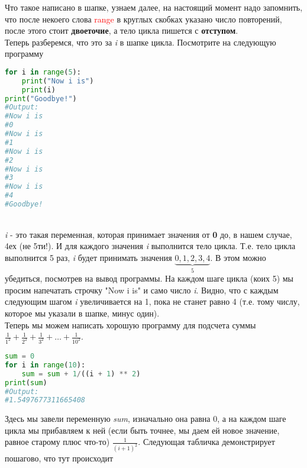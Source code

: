 \documentclass[12pt]{article} %
\begin{document}
Что такое написано в шапке, узнаем далее, на настоящий момент надо запомнить, что после некоего слова \textcolor{red}{range} в круглых скобках указано число повторений, после этого стоит \textbf{двоеточие}, а тело цикла пишется с \textbf{отступом}.\\
Теперь разберемся, что это за \textit{i} в шапке цикла. Посмотрите на следующую программу
\begin{lstlisting}[language=Python]
for i in range(5): 
	print("Now i is") 
	print(i)
print("Goodbye!") 
#Output:
#Now i is
#0
#Now i is
#1
#Now i is
#2
#Now i is
#3
#Now i is
#4
#Goodbye!
\end{lstlisting}
\\
\textit{i} - это такая переменная, которая принимает значения от \textbf{0} до, в нашем случае, 4ех (не 5ти!). И для каждого значения \textit{i} выполнится тело цикла. Т.е. тело цикла выполнится 5 раз, \textit{i} будет принимать значения $\underbrace{0, 1, 2, 3, 4}_{5}$. В этом можно убедиться, посмотрев на вывод программы. На каждом шаге цикла (коих 5) мы просим напечатать строчку "Now i is" и само число \textit{i}. Видно, что с каждым следующим шагом \textit{i} увеличивается на 1, пока не станет равно 4 (т.е. тому числу, которое мы указали в шапке, минус один). \\
Теперь мы можем написать хорошую программу для подсчета суммы $\frac{1}{1^2} + \frac{1}{2^2} + \frac{1}{3^2} + \ldots + \frac{1}{10^2}$. 
\begin{lstlisting}[language=Python]
sum = 0
for i in range(10):
	sum = sum + 1/((i + 1) ** 2)
print(sum)
#Output:
#1.5497677311665408
\end{lstlisting}
Здесь мы завели переменную \textit{sum}, изначально она равна 0, а на каждом шаге цикла мы прибавляем к ней (если быть точнее, мы даем ей новое значение, равное старому плюс что-то) $\frac{1}{(i + 1)^2}$. Следующая табличка демонстрирует пошагово, что тут происходит\\
\end{document}
